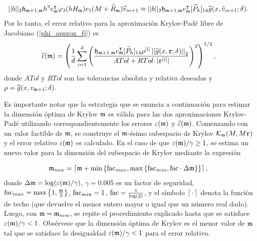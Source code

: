 \begin{equation*}
||b||_2 \mathfrak{h}_{\mathfrak{m}+1,\mathfrak{m}}h^3 e_{\mathfrak{m}}^\intercal\varphi_3(h H_{\mathfrak{m}})e_1(M+\widehat{R}_{\mathfrak{m}})\widehat{v}_{m+1} \approx ||b||_2 \mathfrak{h}_{\mathfrak{m}+1,\mathfrak{m}} e_{\mathfrak{m}}^\intercal[\widetilde{P}_{h}]_{14} \widehat{g}(x,\hat{v}_{m+1};\delta).
\end{equation*}
Por lo tanto, el error relativo para la aproximación Krylov-Padé libre de Jacobiano (\ref{phi_approx_fj}) es \cite{naranjo2023jacobian}
\begin{equation*}
	\widehat{\varepsilon}(\mathfrak{m}) = \left(\frac{1}{d}\sum\limits_{i=1}^{d} \left(\frac{
		\mathfrak{h}_{\mathfrak{m}+1,\mathfrak{m}} e_{\mathfrak{m}}^\intercal
		[\widetilde{P}_h]_{14} \rho^{[i]} \left\lvert \left\lvert \widehat{g}(x,\mathtt{r};\delta) \right\rvert \right\rvert_2}{ATol+ RTol\cdotp
		\rvert \mathtt{r}^{[i]}\rvert}\right)^{2}\right)^{1/2},
\end{equation*}
donde $ATol$ y $RTol$ son las tolerancias absoluta y relativa deseadas y $\rho = \widehat{g}(x,v_{\mathfrak{m}+1};\delta)$.


 Es importante notar que la estrategia que se enuncia a continuación para estimar la dimensión óptima de Krylov $\mathfrak{m}$ es válida para las dos aproximaciones Krylov-Padé utilizando correspondientemente los errores $\varepsilon(\mathfrak{m})$ y $\widehat{\varepsilon}(\mathfrak{m})$.	Comenzando con un valor factible de $\mathfrak{m}$, se construye el $\mathfrak{m}$-ésimo subespacio de Krylov $\mathcal{K}_{\mathfrak{m}}(M,M\mathtt{r})$ y el error relativo $\varepsilon(\mathfrak{m})$ es calculado. En el caso de que $\varepsilon(\mathfrak{m})/\gamma \geq 1$, se estima un nuevo valor para la dimensión del subespacio de Krylov mediante la expresión

\begin{equation} \label{eq:m-new}
\mathfrak{m}_{new} = \left\lceil \mathfrak{m} + \min\left\{ \mathrm{fac}_{max} , \max\left\{ \mathrm{fac}_{min},
		\mathrm{fac}\cdot\Delta\mathfrak{m} \right\}  \right\} \right\rceil,
\end{equation}
 \vspace{-0.1in}
\hspace{-0.26in} donde $\Delta\mathfrak{m}=\log(\varepsilon(\mathfrak{m})/\gamma)$, $\gamma=0$.005 es un factor de seguridad, $\mathrm{fac}_{max}= \max\left\{  1, \frac{\mathfrak{m}}{3}  \right\}$, $\mathrm{fac}_{min}= 1 $, $\mathrm{fac}=\frac{1}{\log(2)}$, y el símbolo $\left\lceil \cdot \right\rceil$ denota la función de techo (que devuelve el menor entero mayor o igual que un número real dado). Luego, con $\mathfrak{m}=\mathfrak{m}_{new}$, se repite el procedimiento explicado hasta que se satisface $\varepsilon(\mathfrak{m})/\gamma< 1$. Obsérvese que la dimensión óptima de Krylov es el menor valor de $\mathfrak{m}$ tal que se satisface la desigualdad  $\varepsilon(\mathfrak{m})/\gamma< 1$ para el error relativo.


